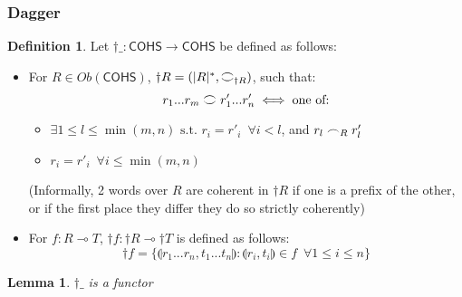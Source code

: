 \documentclass[11pt, oneside]{article}
\theoremstyle{plain}
\newtheorem{lemma}[theorem]{Lemma}
\theoremstyle{definition}
\newtheorem{definition}[theorem]{Definition}
\let\originaldagger\dagger
\renewcommand{\dag}{\mathord{\originaldagger}}
\newcommand{\lp}{\llparenthesis}
\newcommand{\rp}{\rrparenthesis}
\newcommand{\cohs}{{\mathsf{COHS}}}
\newcommand{\coh}[1][]{\mathrel{\vcenter{\offinterlineskip\hbox{$\frown$}\vskip0.2ex\hbox{$\smile$}}_{\ifx\\#1\\\else#1\fi}}}
\newcommand{\scoh}[1][]{\mathrel{\frown}_{\ifx\\#1\\\else#1\fi}}
\begin{document}
\subsubsection{Dagger}
\begin{definition}
    Let $\dag\_:\cohs\to\cohs$ be defined as follows:

    \begin{itemize}
        \item
        For $R\in Ob(\cohs)$, $\dag R=(|R|^*,\coh[\dag R])$, such that:
        $$r_1...r_m \coh r'_1...r'_n \iff \text{one of:}$$

        \begin{itemize}
            \item
            $\exists 1\leq l \leq \min(m,n) \text{ s.t. } r_i=r'_i \enspace\forall i<l$, and $r_l \scoh[R] r'_l$

            \item
            $r_i = r'_i \enspace\forall i\le\min(m,n)$
        \end{itemize}

        (Informally, 2 words over $R$ are coherent in $\dag R$ if one is a prefix of the other, or if the first place they differ they do so strictly coherently)

        \item
        For $f:R\multimap T$, $\dag f:\dag R\multimap\dag T$ is defined as follows:
        $$\dag f=\{\lp r_1...r_n,t_1...t_n\rp:\lp r_i,t_i\rp\in f\enspace\forall 1\le i\le n\}$$
    \end{itemize}
\end{definition}

\begin{lemma}
    $\dag\_$ is a functor
\end{lemma}
\end{document}
